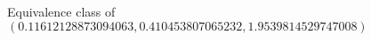 \documentclass[preview]{standalone}
\begin{document}
\begin{center}
Equivalence class of $(0.11612128873094063, 0.410453807065232, 1.9539814529747008)$
\end{center}
\end{document}
